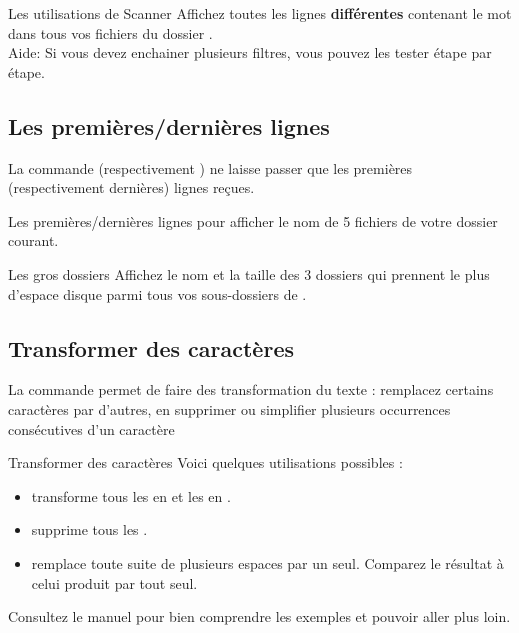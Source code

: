 \documentclass[a4paper,11pt]{style-esi/td}
\begin{document}
		\begin{Exercice}{Les utilisations de Scanner}
			Affichez toutes les lignes \textbf{différentes}
			contenant le mot  dans tous vos fichiers 
			du dossier .
			\\Aide: 
			Si vous devez enchainer plusieurs filtres,
			vous pouvez les tester étape par étape.
		\end{Exercice}

	\subsection{Les premières/dernières lignes}
	
		La commande  (respectivement )
		ne laisse passer que les premières (respectivement dernières)
		lignes reçues.

		\begin{Experience}{Les premières/dernières lignes}
			pour afficher le nom de 5 fichiers  de votre dossier courant.
		\end{Experience}

		\begin{Exercice}{Les gros dossiers}
			Affichez le nom et la taille des 3 dossiers 
			qui prennent le plus d'espace disque 
			parmi tous vos sous-dossiers de . 
		\end{Exercice}

	\subsection{Transformer des caractères}
	
		La commande  permet de faire des transformation du texte :
		remplacez certains caractères par d'autres, en supprimer ou simplifier 
		plusieurs occurrences consécutives d'un caractère 

		\begin{Exemple}{Transformer des caractères}
			Voici quelques utilisations possibles :
			\begin{itemize}
			\item 
				transforme tous les  en 
				et les  en .
			\item
				supprime tous les .
			\item 
				remplace toute suite de plusieurs espaces par un seul.
				Comparez le résultat à celui produit par  tout seul.
			\end{itemize}
			Consultez le manuel pour bien comprendre les exemples
			et pouvoir aller plus loin.
		\end{Exemple}
\end{document}

